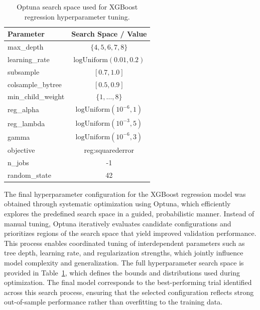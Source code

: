 \documentclass[conference]{IEEEtran}
\begin{document}
\begin{table}[h]
    \centering
    \renewcommand{\arraystretch}{1.2}
    \begin{tabular}{lc}
        \toprule
        Parameter          & Search Space / Value              \\
        \midrule
        max\_depth         & $\{4,5,6,7,8\}$                   \\
        learning\_rate     & $\mathrm{logUniform}(0.01, 0.2)$  \\
        subsample          & $[0.7, 1.0]$                      \\
        colsample\_bytree  & $[0.5, 0.9]$                      \\
        min\_child\_weight & $\{1,\dots,8\}$                   \\
        reg\_alpha         & $\mathrm{logUniform}(10^{-6}, 1)$ \\
        reg\_lambda        & $\mathrm{logUniform}(10^{-3}, 5)$ \\
        gamma              & $\mathrm{logUniform}(10^{-6}, 3)$ \\
        objective          & reg:squarederror                  \\
        n\_jobs            & -1                                \\
        random\_state      & 42                                \\
        \bottomrule
    \end{tabular}
    \caption{Optuna search space used for XGBoost regression hyperparameter tuning.}
    \label{tab:optuna_search_space}
\end{table}

The final hyperparameter configuration for the XGBoost regression model was obtained through systematic optimization using Optuna, which efficiently explores the predefined search space in a guided, probabilistic manner. Instead of manual tuning, Optuna iteratively evaluates candidate configurations and prioritizes regions of the search space that yield improved validation performance. This process enables coordinated tuning of interdependent parameters such as tree depth, learning rate, and regularization strengths, which jointly influence model complexity and generalization. The full hyperparameter search space is provided in Table~\ref{tab:optuna_search_space}, which defines the bounds and distributions used during optimization. The final model corresponds to the best-performing trial identified across this search process, ensuring that the selected configuration reflects strong out-of-sample performance rather than overfitting to the training data.
\end{document}
